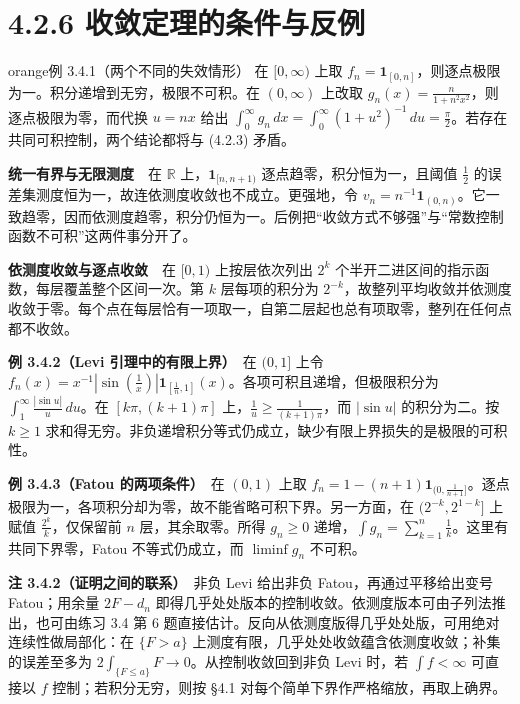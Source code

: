 \documentclass[11pt,a4paper]{article}
\begin{document}
\clearpage\section[\S{}4.2.6
收敛定理的条件与反例]{4.2.6
收敛定理的条件与反例}\label{ux6536ux655bux5b9aux7406ux7684ux6761ux4ef6ux4e0eux53cdux4f8b}

\begin{sboxenv}{orange}{例 3.4.1（两个不同的失效情形）}
在 \([0,\infty)\) 上取
\(f_n=\mathbf1_{[0,n]}\)，则逐点极限为一。积分递增到无穷，极限不可积。在
\((0,\infty)\) 上改取
\(g_n(x)=\frac{n}{1+n^2x^2}\)，则逐点极限为零，而代换 \(u=nx\) 给出
\(\int_0^\infty g_n\,dx=\int_0^\infty(1+u^2)^{-1}\,du=\frac{\pi}{2}\)。若存在共同可积控制，两个结论都将与
(4.2.3) 矛盾。

\end{sboxenv}

\textbf{统一有界与无限测度}　在 \(\mathbb R\) 上，\(\mathbf1_{[n,n+1)}\)
逐点趋零，积分恒为一，且阈值 \(\frac{1}{2}\)
的误差集测度恒为一，故连依测度收敛也不成立。更强地，令
\(v_n=n^{-1}\mathbf1_{(0,n)}\)。它一致趋零，因而依测度趋零，积分仍恒为一。后例把``收敛方式不够强''与``常数控制函数不可积''这两件事分开了。

\textbf{依测度收敛与逐点收敛}　在 \([0,1)\) 上按层依次列出 \(2^k\)
个半开二进区间的指示函数，每层覆盖整个区间一次。第 \(k\) 层每项的积分为
\(2^{-k}\)，故整列平均收敛并依测度收敛于零。每个点在每层恰有一项取一，自第二层起也总有项取零，整列在任何点都不收敛。

\textbf{例 3.4.2（Levi 引理中的有限上界）}　在 \((0,1]\) 上令
\(f_n(x)=x^{-1}|\sin(\frac{1}{x})|\mathbf1_{[\frac{1}{n},1]}(x)\)。各项可积且递增，但极限积分为
\(\int_1^\infty \frac{|\sin u|}{u}\,du\)。在 \([k\pi,(k+1)\pi]\)
上，\(\frac{1}{u}\ge\frac{1}{(k+1)\pi}\)，而 \(|\sin u|\) 的积分为二。按
\(k\ge1\)
求和得无穷。非负递增积分等式仍成立，缺少有限上界损失的是极限的可积性。

\textbf{例 3.4.3（Fatou 的两项条件）}　在 \((0,1)\) 上取
\(f_n=1-(n+1)\mathbf1_{(0,\frac{1}{n+1}]}\)。逐点极限为一，各项积分却为零，故不能省略可积下界。另一方面，在
\((2^{-k},2^{1-k}]\) 上赋值 \(\frac{2^k}{k}\)，仅保留前 \(n\)
层，其余取零。所得 \(g_n\ge0\)
递增，\(\int g_n=\sum_{k=1}^n \frac{1}{k}\)。这里有共同下界零，Fatou
不等式仍成立，而 \(\liminf g_n\) 不可积。

\textbf{注 3.4.2（证明之间的联系）}　非负 Levi 给出非负
Fatou，再通过平移给出变号 Fatou；用余量 \(2F-d_n\)
即得几乎处处版本的控制收敛。依测度版本可由子列法推出，也可由练习 3.4 第
6 题直接估计。反向从依测度版得几乎处处版，可用绝对连续性做局部化：在
\(\{F>a\}\) 上测度有限，几乎处处收敛蕴含依测度收敛；补集的误差至多为
\(2\int_{\{F\le a\}}F\to0\)。从控制收敛回到非负 Levi 时，若
\(\int f<\infty\) 可直接以 \(f\) 控制；若积分无穷，则按 §4.1
对每个简单下界作严格缩放，再取上确界。
\end{document}
